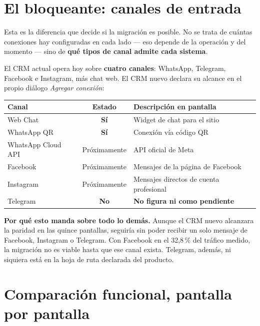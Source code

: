 \documentclass[11pt,a4paper]{article}
\newcommand{\si}{\textcolor{ok}{\textbf{Sí}}}
\newcommand{\no}{\textcolor{warn}{\textbf{No}}}
\begin{document}
\section{El bloqueante: canales de entrada}
\label{sec:canales}

Esta es la diferencia que decide si la migración es posible. No se trata de cuántas
conexiones hay configuradas en cada lado --- eso depende de la operación y del momento ---
sino de \textbf{qué tipos de canal admite cada sistema}.

El CRM actual opera hoy sobre \textbf{cuatro canales}: WhatsApp, Telegram, Facebook e
Instagram, más chat web. El CRM nuevo declara su alcance en el propio diálogo
\emph{Agregar conexión}:

\begin{center}
\begin{tabularx}{\textwidth}{@{}lcL@{}}
\toprule
\textbf{Canal} & \textbf{Estado} & \textbf{Descripción en pantalla} \\
\midrule
Web Chat            & \si            & Widget de chat para el sitio \\
WhatsApp QR         & \si            & Conexión vía código QR \\
WhatsApp Cloud API  & Próximamente   & API oficial de Meta \\
Facebook            & Próximamente   & Mensajes de la página de Facebook \\
Instagram           & Próximamente   & Mensajes directos de cuenta profesional \\
Telegram            & \no            & \textbf{No figura ni como pendiente} \\
\bottomrule
\end{tabularx}
\end{center}

\begin{alerta}
\textbf{Por qué esto manda sobre todo lo demás.} Aunque el CRM nuevo alcanzara la
paridad en las quince pantallas, seguiría sin poder recibir un solo mensaje de
Facebook, Instagram o Telegram. Con Facebook en el 32,8\,\% del tráfico medido, la
migración no es viable hasta que ese canal exista. Telegram, además, ni siquiera está
en la hoja de ruta declarada del producto.
\end{alerta}

\section{Comparación funcional, pantalla por pantalla}
\label{sec:funcional}
\end{document}

